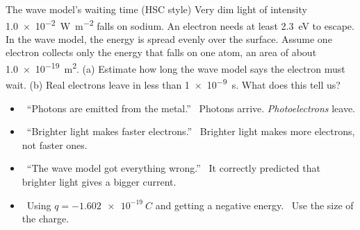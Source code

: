 \begin{workedexample}{The wave model's waiting time (HSC style)}\label{ch3:we:delay}
Very dim light of intensity \qty{1.0e-2}{W.m^{-2}} falls on sodium. An electron needs
at least \qty{2.3}{eV} to escape. In the wave model, the energy is spread evenly over
the surface. Assume one electron collects only the energy that falls on one atom, an
area of about \qty{1.0e-19}{m^2}. (a) Estimate how long the wave model says the
electron must wait. (b) Real electrons leave in less than \qty{1e-9}{s}. What does
this tell us?
\end{workedexample}

\begin{mistakes}
\begin{itemize}
  \item \xmark\ ``Photons are emitted from the metal.''
        \cmark\ Photons arrive. \emph{Photoelectrons} leave.
  \item \xmark\ ``Brighter light makes faster electrons.''
        \cmark\ Brighter light makes more electrons, not faster ones.
  \item \xmark\ ``The wave model got everything wrong.''
        \cmark\ It correctly predicted that brighter light gives a bigger current.
  \item \xmark\ Using $q = \qty{-1.602e-19}{C}$ and getting a negative energy.
        \cmark\ Use the size of the charge.
\end{itemize}
\end{mistakes}

